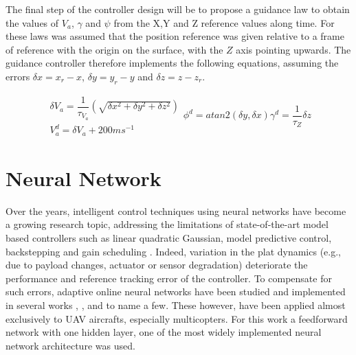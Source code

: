 The final step of the controller design will be to propose a guidance law to obtain the values of $V_a$, $\gamma$ and $\psi$ from the X,Y and Z reference values along time. For these laws was assumed that the position reference was given relative to a frame of reference with the origin on the surface, with the $Z$ axis pointing upwards. The guidance controller therefore implements the following equations, assuming the errors $\delta x = x_r - x$, $\delta y = y_r - y$ and $\delta z = z - z_r$.

\begin{subequations}
	\begin{gather}
	\delta V_a = \dfrac{1}{\tau_{V_a}}(\sqrt{\delta x^2 + \delta y^2 + \delta z^2})\\
	V_a^d= \delta V_a  + 200 ms^{-1}
	\end{gather}
	\begin{equation}
	\phi^d = atan2(\delta y,\delta x)
	\end{equation}
	\begin{equation}
	\gamma^d = \dfrac{1}{\tau_Z}\delta z
	\end{equation}
	\label{eq:guidance_law}
\end{subequations}
\section{Neural Network}
\label{section:NN}


Over the years, intelligent control techniques using neural networks have become a growing research topic, addressing the limitations of state-of-the-art model based controllers such as linear quadratic Gaussian, model predictive control, backstepping and gain scheduling \citep{SotA_IFCS}. Indeed, variation in the plat dynamics (e.g., due to payload changes, actuator or sensor degradation) deteriorate the performance and reference tracking error of the controller. To compensate for such errors, adaptive online neural networks have been studied and implemented in several works \cite{quad_NLI+NN}, \cite{NN_PID}, \cite{UAV_adaptive} and \cite{NN_NLI} to name a few. These however, have been applied almost exclusively to UAV aircrafts, especially multicopters. For this work a feedforward network with one hidden layer, one of the most widely implemented neural network architecture \cite{SotA_IFCS} was used.

